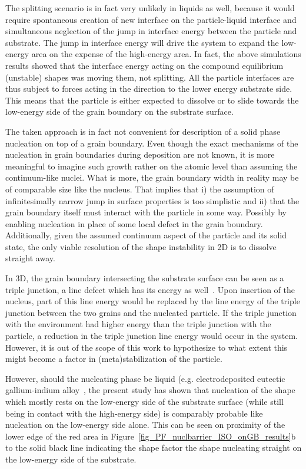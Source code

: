 The splitting scenario is in fact very unlikely in liquids as well, because it would require spontaneous creation of new interface on the particle-liquid interface and simultaneous neglection of the jump in interface energy between the particle and substrate. The jump in interface energy will drive the system to expand the low-energy area on the expense of the high-energy area. In fact, the above simulations results showed that the interface energy acting on the compound equilibrium (unstable) shapes was moving them, not splitting. All the particle interfaces are thus subject to forces acting in the direction to the lower energy substrate side. This means that the particle is either expected to dissolve or to slide towards the low-energy side of the grain boundary on the substrate surface.

The taken approach is in fact not convenient for description of a solid phase nucleation on top of a grain boundary. Even though the exact mechanisms of the nucleation in grain boundaries during deposition are not known, it is more meaningful to imagine such growth rather on the atomic level than assuming the continuum-like nuclei. What is more, the grain boundary width in reality may be of comparable size like the nucleus. That implies that i) the assumption of infinitesimally narrow jump in surface properties is too simplistic and ii) that the grain boundary itself must interact with the particle in some way. Possibly by enabling nucleation in place of some local defect in the grain boundary. Additionally, given the assumed continuum aspect of the particle and its solid state, the only viable resolution of the shape instability in 2D is to dissolve straight away.

In 3D, the grain boundary intersecting the substrate surface can be seen as a triple junction, a line defect which has its energy as well~\cite{Milchev2002}. Upon insertion of the nucleus, part of this line energy would be replaced by the line energy of the triple junction between the two grains and the nucleated particle. If the triple junction with the environment had higher energy than the triple junction with the particle, a reduction in the triple junction line energy would occur in the system. However, it is out of the scope of this work to hypothesize to what extent this might become a factor in (meta)stabilization of the particle. 

However, should the nucleating phase be liquid (e.g. electrodeposited eutectic gallium-indium alloy~\cite{Monnens2023}, the present study has shown that nucleation of the shape which mostly rests on the low-energy side of the substrate surface (while still being in contact with the high-energy side) is comparably probable like nucleation on the low-energy side alone. This can be seen on proximity of the lower edge of the red area in Figure~\ref{fig_PF_nuclbarrier_ISO_onGB_results}b to the solid black line indicating the shape factor the shape nucleating straight on the low-energy side of the substrate. 

